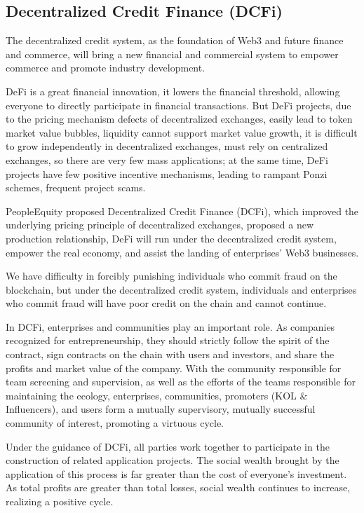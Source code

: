 \documentclass{article}
\begin{document}
\subsection{Decentralized Credit Finance (DCFi)}

The decentralized credit system, as the foundation of Web3 and future finance and commerce, will bring a new financial and commercial system to empower commerce and promote industry development.

DeFi is a great financial innovation, it lowers the financial threshold, allowing everyone to directly participate in financial transactions. But DeFi projects, due to the pricing mechanism defects of decentralized exchanges, easily lead to token market value bubbles, liquidity cannot support market value growth, it is difficult to grow independently in decentralized exchanges, must rely on centralized exchanges, so there are very few mass applications; at the same time, DeFi projects have few positive incentive mechanisms, leading to rampant Ponzi schemes, frequent project scams.

PeopleEquity proposed Decentralized Credit Finance (DCFi), which improved the underlying pricing principle of decentralized exchanges, proposed a new production relationship, DeFi will run under the decentralized credit system, empower the real economy, and assist the landing of enterprises' Web3 businesses.

We have difficulty in forcibly punishing individuals who commit fraud on the blockchain, but under the decentralized credit system, individuals and enterprises who commit fraud will have poor credit on the chain and cannot continue.

In DCFi, enterprises and communities play an important role. As companies recognized for entrepreneurship, they should strictly follow the spirit of the contract, sign contracts on the chain with users and investors, and share the profits and market value of the company. With the community responsible for team screening and supervision, as well as the efforts of the teams responsible for maintaining the ecology, enterprises, communities, promoters (KOL \& Influencers), and users form a mutually supervisory, mutually successful community of interest, promoting a virtuous cycle.

Under the guidance of DCFi, all parties work together to participate in the construction of related application projects. The social wealth brought by the application of this process is far greater than the cost of everyone's investment. As total profits are greater than total losses, social wealth continues to increase, realizing a positive cycle.
\end{document}
